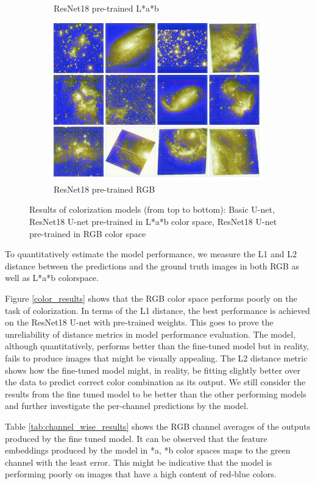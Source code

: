 \documentclass{article} %
\begin{document}
\begin{figure}[!htb]
\begin{subfigure}[t]{0.3\textwidth}
    		\caption{ResNet18 pre-trained L*a*b}
    		\label{fig: resnet18_pre}
    	\end{subfigure}
    	\begin{subfigure}[t]{0.3\textwidth}
    		\centering
    		\includegraphics[width=\textwidth]{figures/samples_coco}
    		\caption{ResNet18 pre-trained RGB}
    		\label{fig: resnet18_rgb}
    	\end{subfigure}
    	\caption{Results of colorization models (from top to bottom): Basic U-net, ResNet18 U-net pre-trained in L*a*b color space, ResNet18 U-net pre-trained in RGB color space}
    	\label{fig: comparisons}
    \end{figure}
    To quantitatively estimate the model performance, we measure the L1 and L2 distance between the predictions and the ground truth images in both RGB as well as L*a*b colorspace. 
    
    Figure \ref{color_results} shows that the RGB color space performs poorly on the task of colorization. In terms of the L1 distance, the best performance is achieved on the ResNet18 U-net with pre-trained weights. This goes to prove the unreliability of distance metrics in model performance evaluation. The model, although quantitatively, performs better than the fine-tuned model but in reality, fails to produce images that might be visually appealing. The L2 distance metric shows how the fine-tuned model might, in reality, be fitting slightly better over the data to predict correct color combination as its output. We still consider the results from the fine tuned model to be better than the other performing models and further investigate the per-channel predictions by the model.
    
    Table \ref{tab:channel_wise_results} shows the RGB channel averages of the outputs produced by the fine tuned model. It can be observed that the feature embeddings produced by the model in *a, *b color spaces maps to the green channel with the least error. This might be indicative that the model is performing poorly on images that have a high content of red-blue colors. 
     
    
\end{document}
